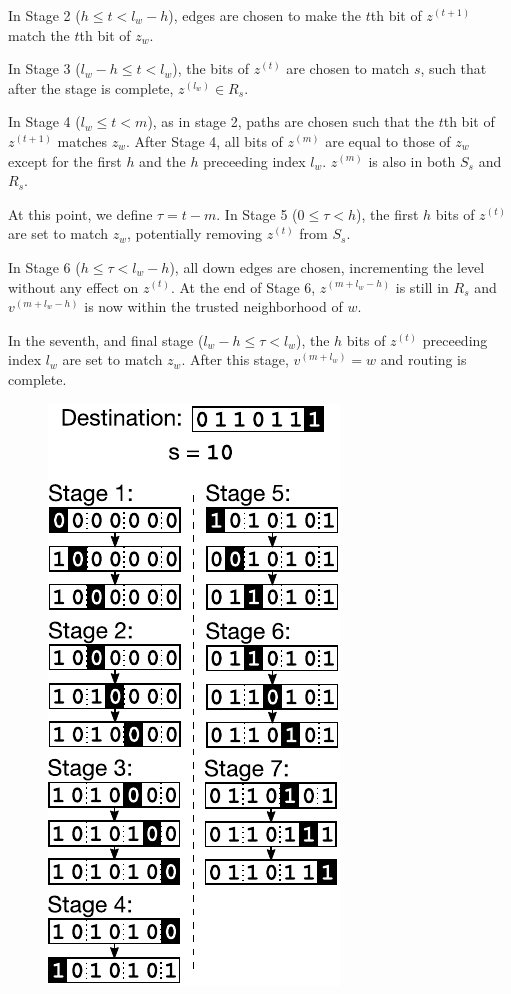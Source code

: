 \documentclass[prodmode,permissions]{acmsmall-ec16}
\begin{document}
In Stage 2 ($h \leq t < l_w - h$), edges are chosen to make the $t$th bit of
$z^{(t+1)}$ match the $t$th bit of $z_w$.

In Stage 3 ($l_w - h \leq t < l_w$), the bits of $z^{(t)}$ are chosen to match $s$,
such that after the stage is complete, $z^{(l_w)} \in R_s$.

In Stage 4 ($l_w \leq t < m$), as in stage 2,
paths are chosen such that the $t$th bit of $z^{(t+1)}$ matches $z_w$.
After Stage 4, all bits of $z^{(m)}$ are equal to those of $z_w$
except for the first $h$ and the $h$ preceeding index $l_w$.
$z^{(m)}$ is also in both $S_s$ and $R_s$.

At this point, we define $\tau = t - m$.
In Stage 5 ($0 \leq \tau < h$), the first $h$ bits of $z^{(t)}$ are set to
match $z_w$, potentially removing $z^{(t)}$ from $S_s$.

In Stage 6 ($h \leq \tau < l_w - h$), all down edges are chosen, incrementing
the level without any effect on $z^{(t)}$.
At the end of Stage 6, $z^{(m + l_w - h)}$ is still in $R_s$ and
$v^{(m + l_w - h)}$ is now within the trusted neighborhood of $w$.

In the seventh, and final stage ($l_w - h \leq \tau < l_w$), the $h$ bits of $z^{(t)}$
preceeding index $l_w$ are set to match $z_w$.
After this stage, $v^{(m + l_w)} = w$ and routing is complete.

\begin{figure}
\begin{center}
\includegraphics{fig-routing.pdf}
\end{center}
\caption{
\label{fig:routing}
}
\end{figure}
\end{document}
